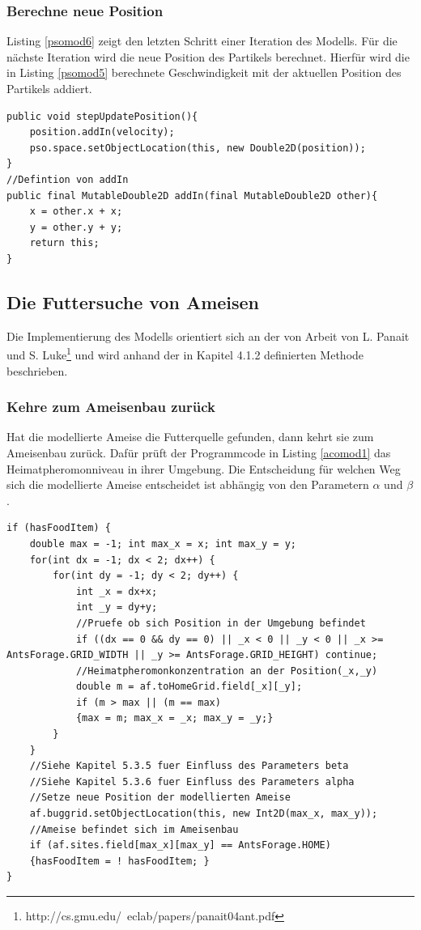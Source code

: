 \documentclass[a4paper, 11pt]{article}
\newcounter{pos}
\begin{document}
\subsubsection{Berechne neue Position}
Listing \ref{psomod6} zeigt den letzten Schritt einer Iteration des Modells. Für die nächste Iteration wird die neue Position des Partikels berechnet. Hierfür wird die in Listing \ref{psomod5} berechnete Geschwindigkeit mit der aktuellen Position des Partikels addiert.\newline
\begin{lstlisting}[caption= PSO: Berechne neue Position,label = psomod6]
public void stepUpdatePosition(){
	position.addIn(velocity);
	pso.space.setObjectLocation(this, new Double2D(position));
}
//Defintion von addIn
public final MutableDouble2D addIn(final MutableDouble2D other){
	x = other.x + x;
	y = other.y + y;
	return this;
}
\end{lstlisting}
\subsection{Die Futtersuche von Ameisen}
Die Implementierung des Modells orientiert sich an der von Arbeit von L. Panait und S. Luke\footnote{http://cs.gmu.edu/~eclab/papers/panait04ant.pdf } und wird anhand der in Kapitel 4.1.2 definierten Methode beschrieben. 
\subsubsection{Kehre zum Ameisenbau zurück}
Hat die modellierte Ameise die Futterquelle gefunden, dann kehrt sie zum Ameisenbau zurück. Dafür prüft der Programmcode in Listing \ref{acomod1} das Heimatpheromonniveau in ihrer Umgebung. Die Entscheidung für welchen Weg sich die modellierte Ameise entscheidet ist abhängig von den Parametern $\alpha$ und $\beta$.\newline
\begin{lstlisting}[caption= Ameisen: Kehre zum Ameisenbau zurück,label = acomod1]
if (hasFoodItem) {
	double max = -1; int max_x = x; int max_y = y;	
	for(int dx = -1; dx < 2; dx++) {
		for(int dy = -1; dy < 2; dy++) {
			int _x = dx+x;
			int _y = dy+y;
			//Pruefe ob sich Position in der Umgebung befindet
			if ((dx == 0 && dy == 0) || _x < 0 || _y < 0 || _x >= AntsForage.GRID_WIDTH || _y >= AntsForage.GRID_HEIGHT) continue;
			//Heimatpheromonkonzentration an der Position(_x,_y)
			double m = af.toHomeGrid.field[_x][_y];
			if (m > max || (m == max) 
			{max = m; max_x = _x; max_y = _y;}
		}
	}
    //Siehe Kapitel 5.3.5 fuer Einfluss des Parameters beta
    //Siehe Kapitel 5.3.6 fuer Einfluss des Parameters alpha
    //Setze neue Position der modellierten Ameise
    af.buggrid.setObjectLocation(this, new Int2D(max_x, max_y));
    //Ameise befindet sich im Ameisenbau
    if (af.sites.field[max_x][max_y] == AntsForage.HOME)
    {hasFoodItem = ! hasFoodItem; }
}
\end{lstlisting}
\end{document}
